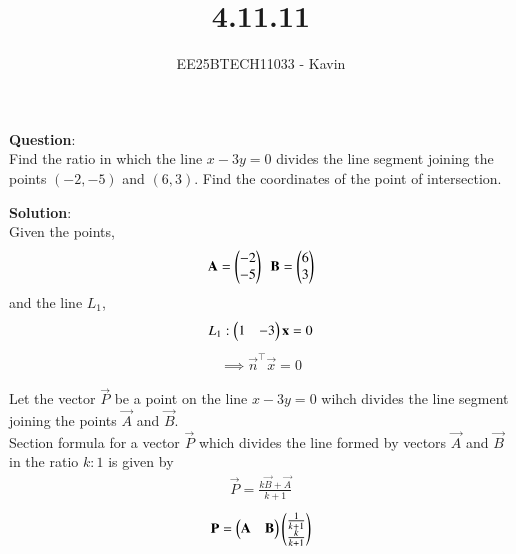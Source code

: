 \documentclass[journal]{IEEEtran}
\begin{document}

\vspace{3cm}

\title{4.11.11}
\author{EE25BTECH11033 - Kavin}
{\let\newpage\relax\maketitle}

\renewcommand{\thefigure}{\theenumi}
\renewcommand{\thetable}{\theenumi}
\setlength{\intextsep}{10pt} %
\textbf{Question}:\\
Find the ratio in which the line $x - 3y = 0$ divides the line segment joining the points $(-2, -5)$ and $(6, 3)$. Find the coordinates of the point of intersection.\\
\bigskip


\textbf{Solution}:\\
Given the points,
\begin{align}
    \vec{A}=\begin{myvec}{-2\\-5}\end{myvec}\ \ 
    \vec{B}=\begin{myvec}{6\\3}\end{myvec}
\end{align}
and the line $L_1$,
\begin{align}
    L_1: \begin{pmatrix}1 & -3\end{pmatrix}\mathbf{x} = 0
\end{align}
\begin{align}
    \implies \vec{n}^{\top}\vec{x}=0
\end{align}
\bigskip

Let the vector $\vec{P}$ be a point on the line $x - 3y = 0$ wihch divides the line segment joining the points $\vec{A}$ and $\vec{B}$.
\\
Section formula for a vector $\vec{P}$ which divides the line formed by vectors $\vec{A}$ and $\vec{B}$ in the ratio $k:1$ is given by
\begin{align}
    \vec{P}=\frac{k\vec{B}+\vec{A}}{k+1}
\end{align}
\begin{align}
    \mathbf{P}=\begin{pmatrix}\mathbf{A} & \mathbf{B}\end{pmatrix}\begin{pmatrix}\frac{1}{k+1}\\\frac{k}{k+1}\end{pmatrix}
\end{align}\\
\bigskip
\end{document}
